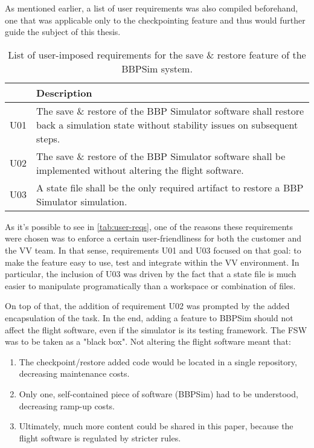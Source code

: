 {As mentioned earlier, a list of user requirements was also compiled beforehand, one that was applicable only to the checkpointing feature and thus would further guide the subject of this thesis. 

\begin{table}[htbp]
	\vspace{12pt}
	\centering
	\begin{tabularx}{\linewidth}{>{\centering}p{3cm} X}
		\toprule
		{\bfseries Requirement\newline Number} & \textbf{Description}\\
		\midrule
		U01 & {The save \& restore of the BBP Simulator software shall restore back a simulation state without stability issues on subsequent steps.}\\
		\midrule
		U02 & {The save \& restore of the BBP Simulator software shall be implemented without altering the flight software.}\\
		\midrule
		U03 & {A state file shall be the only required artifact to restore a BBP Simulator simulation.}\\
		\bottomrule
	\end{tabularx}
	\caption{List of user-imposed requirements for the save \& restore feature of the \gls{BBPSim} system.}
	\label{tab:user-reqs}
\end{table}

As it's possible to see in \autoref{tab:user-reqs}, one of the reasons these requirements were chosen was to enforce a certain user-friendliness for both the customer and the \gls{VV} team. In that sense, requirements U01 and U03 focused on that goal: to make the feature easy to use, test and integrate within the \gls{VV} environment. In particular, the inclusion of U03 was driven by the fact that a state file is much easier to manipulate programatically than a workspace or combination of files.

On top of that, the addition of requirement U02 was prompted by the added encapsulation of the task. In the end, adding a feature to \gls{BBPSim} should not affect the flight software, even if the simulator is its testing framework. The FSW was to be taken as a "black box". Not altering the flight software meant that:
\begin{enumerate}
	\item The checkpoint/restore added code would be located in a single repository, decreasing maintenance costs.
	\item Only one, self-contained piece of software (BBPSim) had to be understood, decreasing ramp-up costs.
	\item Ultimately, much more content could be shared in this paper, because the flight software is regulated by stricter rules.
\end{enumerate}

}
